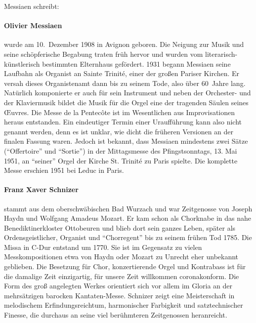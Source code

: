 \documentclass[a5paper,twoside,fontsize=10pt]{scrartcl}
\begin{document}
\medskip

\noindent Messiaen schreibt:

\newpage

\paragraph{Olivier Messiaen} wurde am 10. Dezember 1908 in Avignon geboren. 
Die Neigung zur Musik und seine schöpferische Begabung traten früh hervor und wurden vom literarisch-künstlerisch bestimmten Elternhaus gefördert.
1931 begann Messiaen seine Laufbahn als Organist an Sainte Trinité, einer der großen Pariser Kirchen.
Er versah dieses Organistenamt dann bis zu seinem Tode, also über 60 Jahre lang.
Natürlich komponierte er auch für sein Instrument und neben der Orchester- und der Klaviermusik bildet die Musik für die Orgel eine der tragenden Säulen seines Œuvres.
Die Messe de la Pentecôte ist im Wesentlichen aus Improvisationen heraus entstanden.
Ein eindeutiger Termin einer Uraufführung kann also nicht genannt werden, denn es ist unklar, wie dicht die früheren Versionen an der finalen Fassung waren.
Jedoch ist bekannt, dass Messiaen mindestens zwei Sätze (\enquote{Offertoire} und \enquote{Sortie}) in der Mittagsmesse des Pfingstsonntags, 13. Mai 1951, an \enquote{seiner} Orgel der Kirche St. Trinité zu Paris spielte.
Die komplette Messe erschien 1951 bei Leduc in Paris.


\paragraph{Franz Xaver Schnizer} stammt aus dem oberschwäbischen Bad Wurzach und war Zeitgenosse von Joseph Haydn und Wolfgang Amadeus Mozart. Er kam schon als Chorknabe in das nahe Benediktinerkloster Ottobeuren und blieb dort sein ganzes Leben, später als Ordensgeistlicher, Organist und \enquote{Chorregent} bis zu seinem frühen Tod 1785.
Die Missa in C-Dur entstand um 1770. Sie ist im Gegensatz zu vielen Messkompositionen etwa von Haydn oder Mozart zu Unrecht eher unbekannt geblieben. 
Die Besetzung für Chor, konzertierende Orgel und Kontrabass ist für die damalige Zeit einzigartig, für unsere Zeit willkommen coronakonform. 
Die Form des groß angelegten Werkes orientiert sich vor allem im Gloria an der mehrsätzigen barocken Kantaten-Messe. Schnizer zeigt eine Meisterschaft in melodischem Erfindungsreichtum, harmonischer Farbigkeit und satztechnischer Finesse, die durchaus an seine viel berühmteren Zeitgenossen heranreicht.
\end{document}
